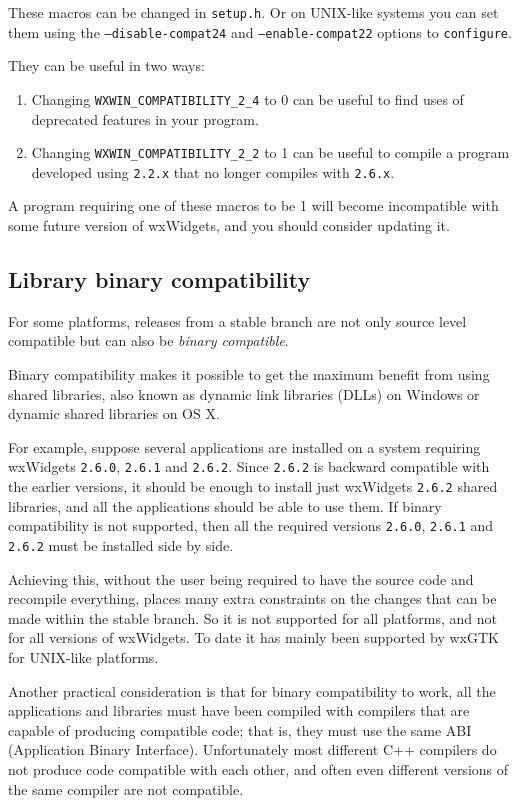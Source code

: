 These macros can be changed in {\tt setup.h}. Or on UNIX-like systems you can
set them using the {\tt --disable-compat24} and {\tt --enable-compat22}
options to {\tt configure}.

They can be useful in two ways:

\begin{enumerate}
\item Changing {\tt WXWIN\_COMPATIBILITY\_2\_4} to 0 can be useful to
find uses of deprecated features in your program.
\item Changing {\tt WXWIN\_COMPATIBILITY\_2\_2} to 1 can be useful to
compile a program developed using {\tt 2.2.x} that no longer compiles
with {\tt 2.6.x}.
\end{enumerate}

A program requiring one of these macros to be 1 will become
incompatible with some future version of wxWidgets, and you should consider
updating it.

\subsection{Library binary compatibility}\label{libbincompatibility}

For some platforms, releases from a stable branch are not only source level
compatible but can also be {\em binary compatible}.

Binary compatibility makes it possible to get the maximum benefit from
using shared libraries, also known as dynamic link libraries (DLLs) on
Windows or dynamic shared libraries on OS X.

For example, suppose several applications are installed on a system requiring
wxWidgets {\tt 2.6.0}, {\tt 2.6.1} and {\tt 2.6.2}. Since {\tt 2.6.2} is
backward compatible with the earlier versions, it should be enough to
install just wxWidgets {\tt 2.6.2} shared libraries, and all the applications
should be able to use them. If binary compatibility is not supported, then all
the required versions {\tt 2.6.0}, {\tt 2.6.1} and {\tt 2.6.2} must be
installed side by side.

Achieving this, without the user being required to have the source code
and recompile everything, places many extra constraints on the changes
that can be made within the stable branch. So it is not supported for all
platforms, and not for all versions of wxWidgets. To date it has mainly
been supported by wxGTK for UNIX-like platforms.

Another practical consideration is that for binary compatibility to work,
all the applications and libraries must have been compiled with compilers
that are capable of producing compatible code; that is, they must use the
same ABI (Application Binary Interface). Unfortunately most different C++
compilers do not produce code compatible with each other, and often even
different versions of the same compiler are not compatible.

